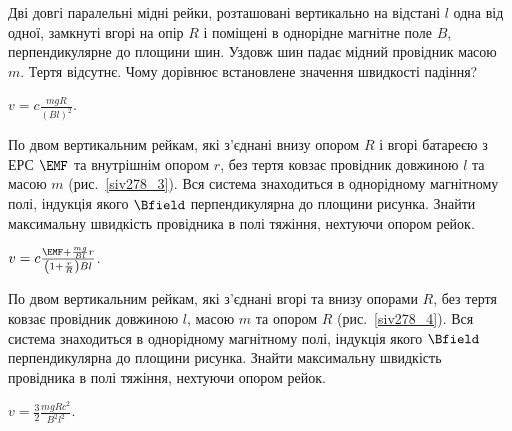 

\begin{problem} %
Дві довгі паралельні мідні рейки, розташовані вертикально на відстані $l$ одна від одної, замкнуті вгорі на опір $R$ і поміщені в однорідне магнітне поле $B$, перпендикулярне до площини шин. Уздовж шин падає мідний провідник масою $m$. Тертя відсутнє. Чому дорівнює встановлене значення швидкості падіння?
\begin{solution}
	$v = c\frac{mgR}{(Bl)^2}$.
\end{solution}
\end{problem}


\begin{problem}\label{prb:siv278_3}
По двом вертикальним рейкам, які з'єднані внизу опором $R$ і вгорі батареєю з ЕРС $\EMF$ та внутрішнім опором $r$, без тертя ковзає провідник довжиною $l$ та масою $m$ (рис.~\ref{siv278_3}). Вся система знаходиться в однорідному магнітному полі, індукція якого $\Bfield$ перпендикулярна до площини рисунка. Знайти максимальну швидкість провідника в полі тяжіння, нехтуючи опором рейок.
\begin{solution}
	$v = c \frac{\EMF + \frac{mg}{Bl}r}{\left( 1 +  \frac{r}{R}\right)Bl}$.
\end{solution}
\end{problem}


\begin{problem}\label{prb:siv278_4}
По двом вертикальним рейкам, які з'єднані вгорі та внизу опорами $R$, без тертя ковзає провідник довжиною $l$, масою $m$ та опором $R$ (рис.~\ref{siv278_4}). Вся система знаходиться в однорідному магнітному полі, індукція якого $\Bfield$ перпендикулярна до площини рисунка. Знайти максимальну швидкість провідника в полі тяжіння, нехтуючи опором рейок.
\begin{solution}
	$v = \frac32 \frac{mgRc^2}{B^2l^2}$.
\end{solution}
\end{problem}

